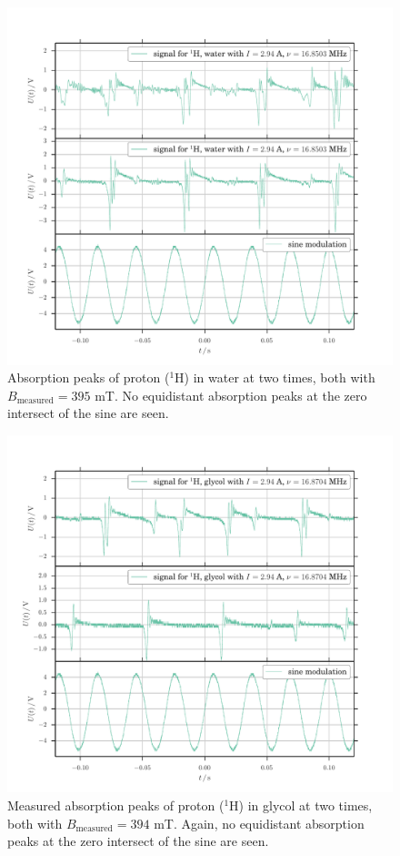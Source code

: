 \begin{figure}
	\includegraphics[width=\textwidth]{figures/f_r_H.pdf}
	\caption{
		Absorption peaks of proton ($^1$H) in water
		at two times, both with $B_\mathrm{measured} = 395$ mT.
		No equidistant absorption peaks at the zero intersect of the sine are seen.
		}
	\label{fig:f_r_H}
\end{figure}

\begin{figure}
	\includegraphics[width=\textwidth]{figures/f_r_glycol.pdf}
	\caption{
		Measured absorption peaks of proton ($^1$H) in glycol
		at two times, both with $B_\mathrm{measured} = 394$ mT.
		Again, no equidistant absorption peaks at the zero intersect of the sine are seen.
		}
	\label{fig:f_r_glycol}
\end{figure}

